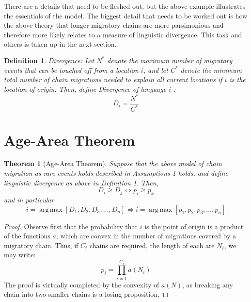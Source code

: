 \documentclass[11pt]{article}
\newtheorem{theorem}{Theorem}
\newtheorem{definition}{Definition}
\DeclareMathOperator*{\argmax}{arg\,max}
\begin{document}
There are a details that need to be fleshed out, but the above example illustrates the essentials of the model. The biggest detail that needs to be worked out is how the above theory that longer migratory chains are more parsimonious and therefore more likely relates to a measure of linguistic divergence. This task and others is taken up in the next section.

\begin{definition}{Divergence:}
Let $N^*$ denote the maximum number of migratory events that can be touched off from a location $i$, and let $C^*$ denote the minimum total number of chain migrations needed to explain all current locations if $i$ is the location of origin. Then, define Divergence of language $i$ :
\begin{equation*}
D_i=\frac{N^*}{C^*}
\end{equation*}
\end{definition}


\section{ Age-Area Theorem}

\begin{theorem}[Age-Area Theorem]
Suppose that the above model of chain migration as rare events holds described in Assumptions 1 holds, and define linguistic divergence as above in Definition 1. Then,  
\begin{equation*}
D_i \geq D_j \Longleftrightarrow p_i\geq p_k
\end{equation*}
and in particular
\begin{equation*}
i=\argmax\left[D_1,D_2,D_3,\hdots,D_n\right] \Longleftrightarrow i=\argmax\left[p_1,p_2,p_3,\hdots,p_n\right]
\end{equation*}
\end{theorem}
\begin{proof}

Observe first that the probability that $i$ is the point of origin is a product of the functions $a$, which are convex in the number of migrations covered by a migratory chain. Thus, if $C_i$ chains are required, the length of each are $N_i$, we may write:
\begin{equation*}
p_i=\prod_{i=1}^{C_i} a(N_i)
\end{equation*} 
The proof is virtually completed by the convexity of $a(N)$, as breaking any chain into two smaller chains is a losing proposition, 
\end{proof} 
\end{document}
